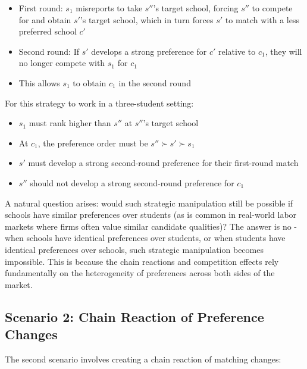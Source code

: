 \documentclass{article}
\begin{document}
\begin{itemize}
    \item First round: $s_1$ misreports to take $s''$'s target school, forcing $s''$ to compete for and obtain $s'$'s target school, which in turn forces $s'$ to match with a less preferred school $c'$
    \item Second round: If $s'$ develops a strong preference for $c'$ relative to $c_1$, they will no longer compete with $s_1$ for $c_1$
    \item This allows $s_1$ to obtain $c_1$ in the second round
\end{itemize}

For this strategy to work in a three-student setting:
\begin{itemize}
    \item $s_1$ must rank higher than $s''$ at $s''$'s target school
    \item At $c_1$, the preference order must be $s'' \succ s' \succ s_1$
    \item $s'$ must develop a strong second-round preference for their first-round match
    \item $s''$ should not develop a strong second-round preference for $c_1$
\end{itemize}
A natural question arises: would such strategic manipulation still be possible if schools have similar preferences over students (as is common in real-world labor markets where firms often value similar candidate qualities)? The answer is no - when schools have identical preferences over students, or when students have identical preferences over schools, such strategic manipulation becomes impossible. This is because the chain reactions and competition effects  rely fundamentally on the heterogeneity of preferences across both sides of the market.





\subsection{Scenario 2: Chain Reaction of Preference Changes}
The second scenario involves creating a chain reaction of matching changes:
\end{document}
